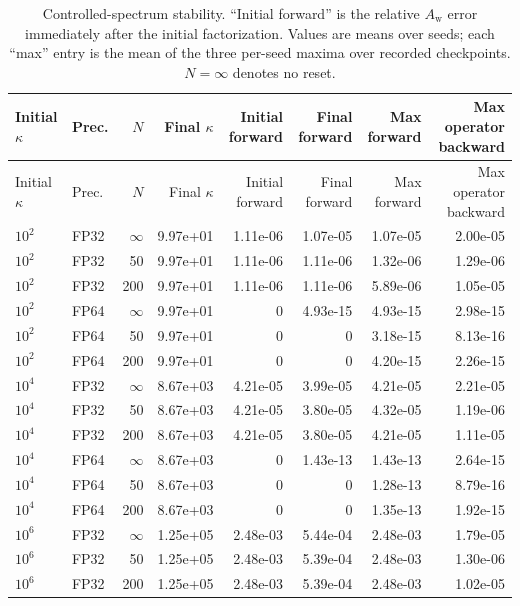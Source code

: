 \documentclass[11pt]{article}
\newcommand{\Aw}{A_{\mathrm w}}
\begin{document}
\begin{landscape}
\scriptsize
\begin{longtable}{@{}llrrrrrr@{}}
\caption{Controlled-spectrum stability.  ``Initial forward'' is the relative
\(\Aw\) error immediately after the initial factorization.  Values are means
over seeds; each ``max'' entry is the mean of the three per-seed maxima over
recorded checkpoints.  \(N=\infty\) denotes no reset.}
\label{tab:e4-positive}\\
\toprule
Initial \(\kappa\) & Prec. & \(N\) & Final \(\kappa\) & Initial forward &
Final forward & Max forward & Max operator backward \\
\midrule
\endfirsthead
\toprule
Initial \(\kappa\) & Prec. & \(N\) & Final \(\kappa\) & Initial forward &
Final forward & Max forward & Max operator backward \\
\midrule
\endhead
$10^{2}$ & FP32 & $\infty$ & 9.97e+01 & 1.11e-06 & 1.07e-05 & 1.07e-05 & 2.00e-05 \\
$10^{2}$ & FP32 & 50 & 9.97e+01 & 1.11e-06 & 1.11e-06 & 1.32e-06 & 1.29e-06 \\
$10^{2}$ & FP32 & 200 & 9.97e+01 & 1.11e-06 & 1.11e-06 & 5.89e-06 & 1.05e-05 \\
$10^{2}$ & FP64 & $\infty$ & 9.97e+01 & 0 & 4.93e-15 & 4.93e-15 & 2.98e-15 \\
$10^{2}$ & FP64 & 50 & 9.97e+01 & 0 & 0 & 3.18e-15 & 8.13e-16 \\
$10^{2}$ & FP64 & 200 & 9.97e+01 & 0 & 0 & 4.20e-15 & 2.26e-15 \\
\midrule
$10^{4}$ & FP32 & $\infty$ & 8.67e+03 & 4.21e-05 & 3.99e-05 & 4.21e-05 & 2.21e-05 \\
$10^{4}$ & FP32 & 50 & 8.67e+03 & 4.21e-05 & 3.80e-05 & 4.32e-05 & 1.19e-06 \\
$10^{4}$ & FP32 & 200 & 8.67e+03 & 4.21e-05 & 3.80e-05 & 4.21e-05 & 1.11e-05 \\
$10^{4}$ & FP64 & $\infty$ & 8.67e+03 & 0 & 1.43e-13 & 1.43e-13 & 2.64e-15 \\
$10^{4}$ & FP64 & 50 & 8.67e+03 & 0 & 0 & 1.28e-13 & 8.79e-16 \\
$10^{4}$ & FP64 & 200 & 8.67e+03 & 0 & 0 & 1.35e-13 & 1.92e-15 \\
\midrule
$10^{6}$ & FP32 & $\infty$ & 1.25e+05 & 2.48e-03 & 5.44e-04 & 2.48e-03 & 1.79e-05 \\
$10^{6}$ & FP32 & 50 & 1.25e+05 & 2.48e-03 & 5.39e-04 & 2.48e-03 & 1.30e-06 \\
$10^{6}$ & FP32 & 200 & 1.25e+05 & 2.48e-03 & 5.39e-04 & 2.48e-03 & 1.02e-05 \\

\end{longtable}
\end{landscape}
\end{document}
